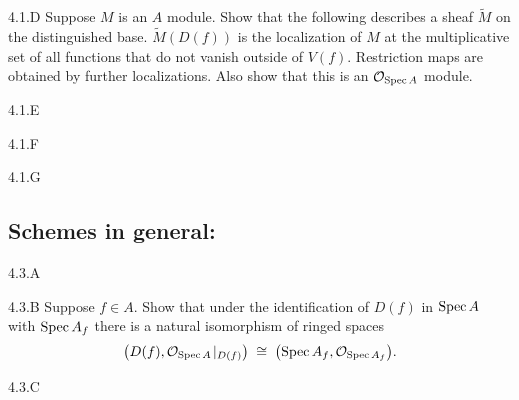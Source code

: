\begin{exercise}{4.1.D}
    Suppose $M$ is an $A$ module. Show that the following describes a sheaf $\widetilde{M}$ on the distinguished base. $\widetilde{M}(D(f))$ is the localization of $M$ at the multiplicative set of all functions that do not vanish outside of $V(f)$. Restriction maps are obtained by further localizations. Also show that this is an $\mathcal{O}_{\operatorname{Spec} A}$ module. 
\end{exercise}
\begin{solution}
    \todo{}
\end{solution}

\begin{exercise}{4.1.E}
\end{exercise}
\begin{solution}
    \todo{}
\end{solution}

\begin{exercise}{4.1.F}
\end{exercise}
\begin{solution}
    \todo{}
\end{solution}


\begin{exercise}{4.1.G}
\end{exercise}
\begin{solution}
    \todo{}
\end{solution}


\subsection{Schemes in general:}

\begin{exercise}{4.3.A}

\end{exercise}
\begin{solution}
    \todo{}
\end{solution}

\begin{exercise}{4.3.B}
Suppose $f \in A$. Show that under the identification of $D(f)$ in $\operatorname{Spec} A$ with $\operatorname{Spec} A_f$ there is a natural isomorphism of ringed spaces
\[ \bigl(D(f), \mathcal{O}_{\operatorname{Spec} A}\!\mid_{D(f)}\bigr)
\;\cong\; \bigl(\operatorname{Spec} A_f, \mathcal{O}_{\operatorname{Spec} A_f}\bigr).
\]
\end{exercise}
\begin{solution}
    \todo{}
\end{solution}

\begin{exercise}{4.3.C}

\end{exercise}
\begin{solution}
    \todo{}
\end{solution}

